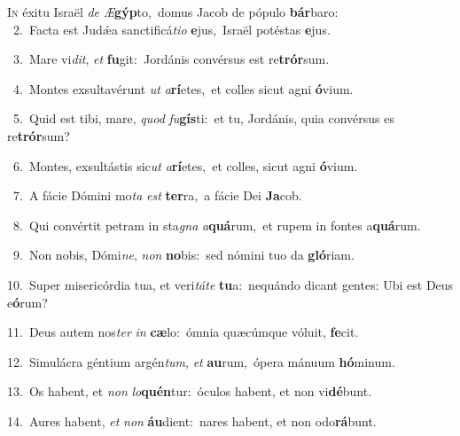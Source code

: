 \lettrine{\initial\textcolor{\initialcolor}{I}}{n} éxitu Israël \textit{de} \textit{Æ}\-\textbf{gýp}to,~\star domus Jacob de pópulo \textbf{bár}\-baro:\\
{\numbfont\textcolor{\numbcolor}{~2.}}~Facta est Judǽa sanctificá\-\textit{ti}\-\textit{o} \textbf{e}\-jus,~\star Israël potéstas \textbf{e}\-jus.\par
{\numbfont\textcolor{\numbcolor}{~3.}}~Mare vi\-\textit{dit}\-, \textit{et} \textbf{fu}\-git:~\star Jordánis convérsus est re\-\textbf{trór}\-sum.\par
{\numbfont\textcolor{\numbcolor}{~4.}}~Montes exsultavérunt \textit{ut} \textit{a}\-\textbf{rí}etes,~\star et colles sicut agni \textbf{ó}\-vium.\par
{\numbfont\textcolor{\numbcolor}{~5.}}~Quid est tibi, mare, \textit{quod} \textit{fu}\-\textbf{gís}ti:~\star et tu, Jordánis, quia convérsus es re\-\textbf{trór}\-sum?\par
{\numbfont\textcolor{\numbcolor}{~6.}}~Montes, exsultástis sic\textit{ut} \textit{a}\-\textbf{rí}etes,~\star et colles, sicut agni \textbf{ó}\-vium.\par
{\numbfont\textcolor{\numbcolor}{~7.}}~A fácie Dómini mo\textit{ta} \textit{est} \textbf{ter}\-ra,~\star a fácie Dei \textbf{Ja}\-cob.\par
{\numbfont\textcolor{\numbcolor}{~8.}}~Qui convértit petram in sta\textit{gna} \textit{a}\-\textbf{quá}rum,~\star et rupem in fontes a\-\textbf{quá}\-rum.\par
{\numbfont\textcolor{\numbcolor}{~9.}}~Non nobis, Dómi\-\textit{ne}\-, \textit{non} \textbf{no}\-bis:~\star sed nómini tuo da \textbf{gló}\-riam.\par
{\numbfont\textcolor{\numbcolor}{10.}}~Super misericórdia tua, et veri\-\textit{tá}\-\textit{te} \textbf{tu}\-a:~\star nequándo dicant gentes: Ubi est Deus e\-\textbf{ó}\-rum?\par
{\numbfont\textcolor{\numbcolor}{11.}}~Deus autem nos\textit{ter} \textit{in} \textbf{cæ}\-lo:~\star ómnia quæcúmque vóluit, \textbf{fe}\-cit.\par
{\numbfont\textcolor{\numbcolor}{12.}}~Simulácra géntium argén\-\textit{tum}\-, \textit{et} \textbf{au}\-rum,~\star ópera mánuum \textbf{hó}\-minum.\par
{\numbfont\textcolor{\numbcolor}{13.}}~Os habent, et \textit{non} \textit{lo}\-\textbf{quén}tur:~\star óculos habent, et non vi\-\textbf{dé}\-bunt.\par
{\numbfont\textcolor{\numbcolor}{14.}}~Aures habent, \textit{et} \textit{non} \textbf{áu}\-dient:~\star nares habent, et non odo\-\textbf{rá}\-bunt.\par
